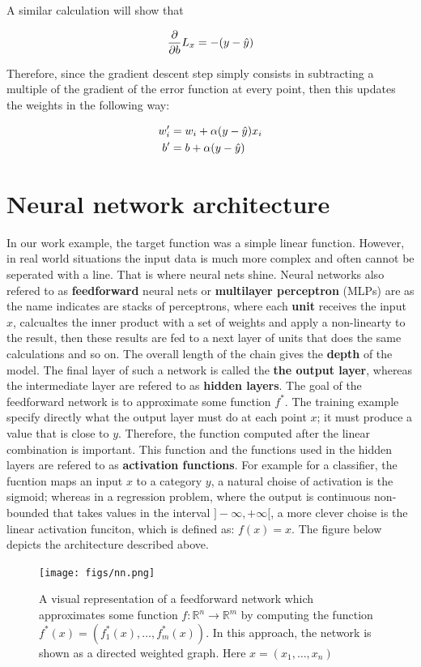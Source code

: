 A similar calculation will show that

$$
\frac{\partial}{\partial b} L_x = -(y - \hat{y})
$$

Therefore, since the gradient descent step simply consists in subtracting a multiple of the gradient of the error function at every point, then this updates the weights in the following way:

\begin{align}
  w^{\prime}_i &= w_i + \alpha (y - \hat{y})x_i \\
  b^{\prime} &= b + \alpha (y - \hat{y})
\end{align}

\section{Neural network architecture}
In our work example, the target function was a simple linear function. However, in real world situations the input data is much more complex and often cannot be seperated with a line. That is where neural nets shine. Neural networks also refered to as \textbf{feedforward} neural nets or \textbf{multilayer perceptron} (MLPs) are as the name indicates are stacks of perceptrons, where each \textbf{unit} receives the input $x$, calcualtes the inner product with a set of weights and apply a non-linearty to the result, then these results are fed to a next layer of units that does the same calculations and so on. The overall length of the chain gives the \textbf{depth} of the model. The final layer of such a network is called the \textbf{the output layer}, whereas the intermediate layer are refered to as \textbf{hidden layers}. The goal of the feedforward network is to approximate some function $f^*$. The training example specify directly what the output layer must do at each point $x$; it must produce a value that is close to $y$. Therefore, the function computed after the linear combination is important. This function and the functions used in the hidden layers are refered to as \textbf{activation functions}. For example for a classifier, the fucntion maps an input $x$ to a category $y$, a natural choise of activation is the sigmoid; whereas in a regression problem, where the output is continuous non-bounded that takes values in the interval $]-\infty, +\infty[$, a more clever choise is the linear activation funciton, which is defined as: $f(x) = x$.
The figure below depicts the architecture described above.

\begin{figure}[!htpb]
  \centering
  \texttt{[image: figs/nn.png]}
  \caption[A visual representation of a feedforward network]{A visual representation of a feedforward network which approximates some function $f : \mathbb{R}^n \longrightarrow \mathbb{R}^m$ by
    computing the function $f^*(x) = (f^*_1(x), \ldots, f^*_m(x))$. In this approach, the network is shown as a
    directed weighted graph. Here $x = (x_1, \ldots, x_n)$}\label{fig:ann}
\end{figure}

